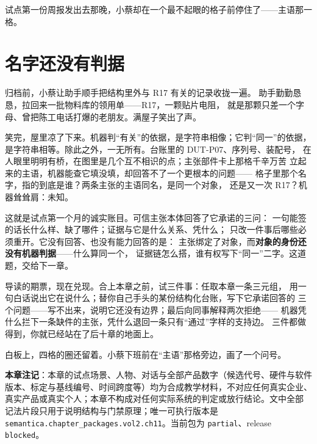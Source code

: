 试点第一份周报发出去那晚，小蔡却在一个最不起眼的格子前停住了——主语那一格。

\section{名字还没有判据}

归档前，小蔡让助手顺手把结构里外与 R17 有关的记录收拢一遍。
助手勤勤恳恳，拉回来一批物料库的领用单——R17，一颗贴片电阻，
就是那颗只差一个字母、曾把陈工电话打爆的老朋友。满屋子笑出了声。

笑完，屋里凉了下来。机器判“有关”的依据，是字符串相像；它判“同一”的依据，
是字符串相等。除此之外，一无所有。台账里的 DUT-P07、序列号、装配号，
在人眼里明明有桥，在图里是几个互不相识的点；主张部件卡上那格千辛万苦
立起来的主语，机器能查它填没填，却回答不了一个更根本的问题——
格子里那个名字，指的到底是谁？两条主张的主语同名，是同一个对象，
还是又一次 R17？机器耸耸肩：未知。

这就是试点第一个月的诚实账目。可信主张本体回答了它承诺的三问：
一句能签的话长什么样、缺了哪件；证据与它是什么关系、凭什么；
只改一件事后哪些必须重开。它没有回答、也没有能力回答的是：
主张绑定了对象，而\textbf{对象的身份还没有机器判据}——什么算同一个，
证据链怎么搭，谁有权写下“同一”二字。这道题，交给下一章。

导读的期票，现在兑现。合上本章之前，试三件事：任取本章一条三元组，
用一句白话说出它在说什么；替你自己手头的某份结构化台账，写下它承诺回答的
三个问题——写不出来，说明它还没有边界；最后向同事解释两次拒绝——
机器凭什么拦下一条缺件的主张，凭什么退回一条只有“通过”字样的支持边。
三件都做得到，你就已经站在了后十章的地面上。

白板上，四格的圈还留着。小蔡下班前在“主语”那格旁边，画了一个问号。


\begin{noteblock}
\textbf{本章注记}：本章的试点场景、人物、对话与全部产品数字（候选代号、硬件与软件
版本、标定与基线编号、时间跨度等）均为合成教学材料，不对应任何真实企业、
真实产品或真实个人；本章不构成对任何实际系统的判定或放行结论。文中全部
记法片段只用于说明结构与门禁原理；唯一可执行版本是
\nolinkurl{semantica.chapter_packages.vol2.ch11}。当前包为 \nolinkurl{partial}、release \nolinkurl{blocked}。
\end{noteblock}
